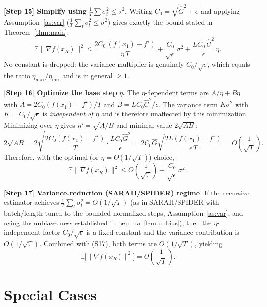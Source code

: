 \documentclass[11pt]{article}
\begin{document}
\noindent\textbf{[Step 15] Simplify using $\tfrac1T\sum\sigma_t^2 \le \sigma^2$.}
Writing $C_0 = \sqrt{\hat G^2+\epsilon}$ and applying Assumption~\ref{as:var}
($\tfrac1T\sum_{t}\sigma_t^2 \le \sigma^2$) gives exactly the bound stated in
Theorem~\ref{thm:main}:
\[
\mathbb{E}\|\nabla f(x_R)\|^2
\le \frac{2 C_0\,(f(x_1)-f^\star)}{\eta\,T}
+ \frac{C_0}{\sqrt{\epsilon}}\,\sigma^2
+ \frac{L C_0\,\hat G^2}{\epsilon}\,\eta.
\tag{S15}
\]
No constant is dropped: the variance multiplier is genuinely $C_0/\sqrt{\epsilon}$,
which equals the ratio $\eta_{\max}/\eta_{\min}$ and is in general $\ge 1$.

\noindent\textbf{[Step 16] Optimize the base step $\eta$.}
The $\eta$-dependent terms are $A/\eta + B\eta$ with
$A = 2C_0(f(x_1)-f^\star)/T$ and $B = LC_0\hat G^2/\epsilon$.
The variance term $K\sigma^2$ with $K = C_0/\sqrt{\epsilon}$ is \emph{independent of $\eta$}
and is therefore unaffected by this minimization.
Minimizing over $\eta$ gives $\eta^\star=\sqrt{A/B}$ and minimal value $2\sqrt{AB}$:
\[
2\sqrt{AB}
= 2\sqrt{\frac{2C_0(f(x_1)-f^\star)}{T}\cdot \frac{LC_0\hat G^2}{\epsilon}}
= 2C_0\hat G\sqrt{\frac{2L(f(x_1)-f^\star)}{\epsilon\,T}}
= O\!\left(\frac{1}{\sqrt T}\right).
\tag{S16}
\]
Therefore, with the optimal (or $\eta=\Theta(1/\sqrt T)$) choice,
\[
\mathbb{E}\|\nabla f(x_R)\|^2
\le O\!\left(\frac{1}{\sqrt T}\right) + \frac{C_0}{\sqrt\epsilon}\,\sigma^2 .
\tag{S17}
\]

\noindent\textbf{[Step 17] Variance-reduction (SARAH/SPIDER) regime.}
If the recursive estimator achieves $\tfrac1T\sum_t\sigma_t^2 = O(1/\sqrt T)$ (as in
SARAH/SPIDER with batch/length tuned to the bounded normalized steps,
Assumption~\ref{as:var}, and using the unbiasedness established in
Lemma~\ref{lem:unbias}), then the $\eta$-independent factor $C_0/\sqrt{\epsilon}$ is a
fixed constant and the variance contribution is $O(1/\sqrt T)$. Combined with (S17),
both terms are $O(1/\sqrt T)$, yielding
\[
\boxed{\;\mathbb{E}\big[\|\nabla f(x_R)\|^2\big] = O\!\left(\frac{1}{\sqrt{T}}\right).\;}
\]

\section*{Special Cases}
\end{document}
